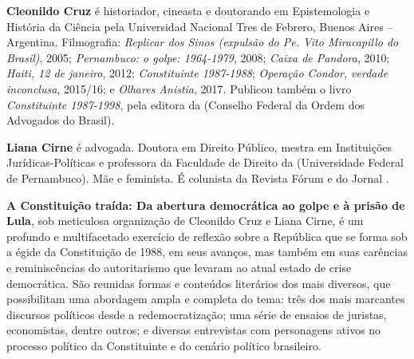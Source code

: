 \textbf{Cleonildo Cruz} é historiador, cineasta e doutorando em Epistemologia e História da Ciência pela Universidad Nacional Tres de Febrero, Buenos Aires – Argentina. Filmografia: \emph{Replicar dos Sinos (expulsão do Pe. Vito Miracapillo do Brasil)}, 2005; \emph{Pernambuco: o golpe: 1964-1979}, 2008; \emph{Caixa de Pandora}, 2010; \emph{Haiti, 12 de janeiro}, 2012; \emph{Constituinte 1987-1988}; \emph{Operação Condor, verdade inconclusa}, 2015/16; e \emph{Olhares Anistia}, 2017. Publicou também o livro \emph{Constituinte 1987-1998}, pela editora da  (Conselho Federal da Ordem dos Advogados do Brasil).

\textbf{Liana Cirne} é advogada. Doutora em Direito Público, mestra em Instituições Jurídicas-Políticas e professora da Faculdade de Direito da  (Universidade Federal de Pernambuco). Mãe e feminista. É colunista da Revista Fórum e do Jornal .

\textbf{A Constituição traída: Da abertura democrática ao golpe e à prisão de Lula}, sob meticulosa organização de Cleonildo Cruz e Liana Cirne, é um profundo e multifacetado exercício de reflexão sobre a República que se forma sob a égide da Constituição de 1988, em seus avanços, mas também em suas carências e reminiscências do autoritarismo que levaram ao atual estado de crise democrática. São reunidas formas e conteúdos literários dos mais diversos, que possibilitam uma abordagem ampla e completa do tema: três dos mais marcantes discursos políticos desde a redemocratização; uma série de ensaios de juristas, economistas, dentre outros; e diversas entrevistas com personagens ativos no processo político da Constituinte e do cenário político brasileiro.

